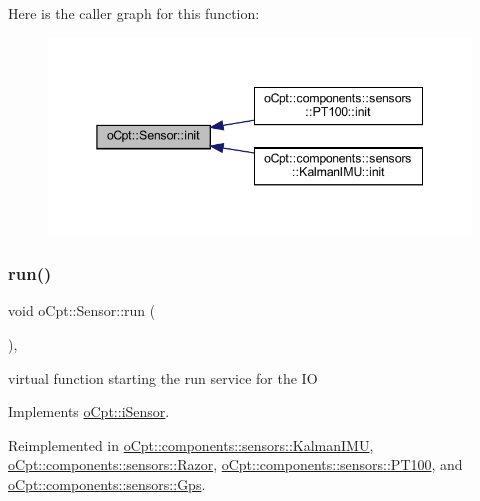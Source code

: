 Here is the caller graph for this function\+:
\nopagebreak
\begin{figure}[H]
\begin{center}
\leavevmode
\includegraphics[width=345pt]{classo_cpt_1_1_sensor_aa612a305a9a3091dd62cd1afb9d4dd7d_icgraph}
\end{center}
\end{figure}
\hypertarget{classo_cpt_1_1_sensor_aef25b0e5f3a8358ee81c97c73909fbe6}{}\label{classo_cpt_1_1_sensor_aef25b0e5f3a8358ee81c97c73909fbe6} 
\subsubsection{\texorpdfstring{run()}{run()}}
{\footnotesize\ttfamily void o\+Cpt\+::\+Sensor\+::run (\begin{DoxyParamCaption}{ }\end{DoxyParamCaption})\hspace{0.3cm}{\ttfamily [override]}, {\ttfamily [virtual]}}

virtual function starting the run service for the IO 

Implements \hyperlink{classo_cpt_1_1i_sensor_abbface05a16b17354c23389d9747bf7c}{o\+Cpt\+::i\+Sensor}.



Reimplemented in \hyperlink{classo_cpt_1_1components_1_1sensors_1_1_kalman_i_m_u_abd725cf96ffa29379c496bed243a520a}{o\+Cpt\+::components\+::sensors\+::\+Kalman\+I\+MU}, \hyperlink{classo_cpt_1_1components_1_1sensors_1_1_razor_ad93891ffb2d47e56d1417f0a40026c6e}{o\+Cpt\+::components\+::sensors\+::\+Razor}, \hyperlink{classo_cpt_1_1components_1_1sensors_1_1_p_t100_a41dfc55a4be7993949feeb5ac013690d}{o\+Cpt\+::components\+::sensors\+::\+P\+T100}, and \hyperlink{classo_cpt_1_1components_1_1sensors_1_1_gps_af703c48b8b7220a1909570f46edae932}{o\+Cpt\+::components\+::sensors\+::\+Gps}.



